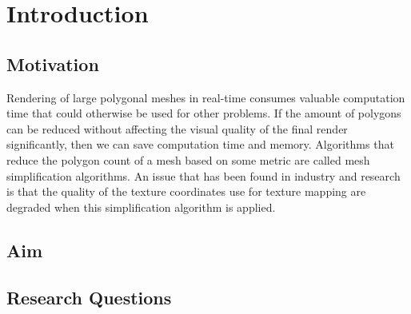 

\chapter{Introduction}
\label{cha:introduction}

\section{Motivation}
\label{sec:motivation}

\iffalse
This is where the studied problem is described from a general
point of view and put in a context which makes it clear that
it is interesting and well worth studying. The aim is to make
the reader interested in the work and create an urge to
continue reading.
\fi

Rendering of large polygonal meshes in real-time consumes valuable computation time that
could otherwise be used for other problems. If the amount of polygons can be reduced without
affecting the visual quality of the final render significantly, then we can save computation time
and memory. Algorithms that reduce the polygon count of a mesh based on some metric are
called mesh simplification algorithms. An issue that has been found in industry and research is
that the quality of the texture coordinates use for texture mapping are degraded when this
simplification algorithm is applied.

\section{Aim}
\label{sec:aim}

\iffalse
What is the underlying purpose of the thesis project?
\fi

\section{Research Questions}
\label{sec:research-questions}

